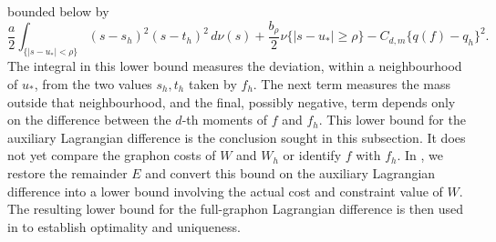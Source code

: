 bounded below by
\begin{equation*}
  \frac{a}{2}
  \int_{\{|s-u_*|<\rho\}}(s-s_h)^2(s-t_h)^2\,d\nu(s)
  +\frac{b_\rho}{2}\nu\{|s-u_*|\ge\rho\}
  -C_{d,m}\{q(f)-q_h\}^2.
\end{equation*}
The integral in this lower bound measures the deviation, within a
neighbourhood of $u_*$, from the two values $s_h,t_h$ taken by $f_h$.  The
next term measures the mass outside that neighbourhood, and the final,
possibly negative, term depends only on the difference between the $d$-th
moments of $f$ and $f_h$.  This lower bound for the auxiliary Lagrangian
difference is the conclusion sought in this subsection.  It does not yet
compare the graphon costs of $W$ and $W_h$ or identify $f$ with $f_h$.  In
, we restore the remainder $E$ and
convert this bound on the auxiliary Lagrangian difference into a lower bound
involving the actual cost and constraint value of $W$.  The resulting lower
bound for the full-graphon Lagrangian difference is then used in
 to establish optimality and uniqueness.


